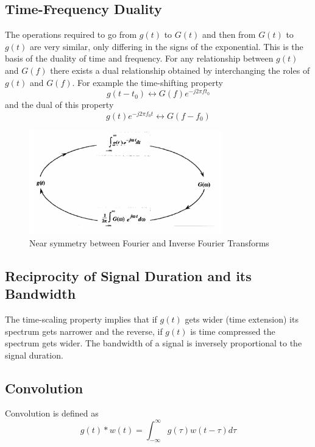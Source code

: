 \documentclass{article}
\begin{document}
    \subsection{Time-Frequency Duality}
    The operations required to go from $g(t)$ to $G(t)$ and then from $G(t)$ to $g(t)$ are very similar, only differing in the signs of the exponential.
    This is the basis of the duality of time and frequency. For any relationship between $g(t)$ and $G(f)$ there exists a dual relationship obtained 
    by interchanging the roles of $g(t)$ and $G(f)$. For example the time-shifting property 
    \begin{equation}
        g(t-t_0) \leftrightarrow G(f)e^{-j2\pi ft_0}
    \end{equation}
    and the dual of this property 
    \begin{equation}
        g(t)e^{-j2\pi f_0t} \leftrightarrow G(f-f_0)
    \end{equation}

    \begin{figure}[h]
        \centering
        \includegraphics[width=0.75\textwidth]{td}
        \caption{Near symmetry between Fourier and Inverse Fourier Transforms}
    \end{figure}

    \subsection{Reciprocity of Signal Duration and its Bandwidth}
    The time-scaling property implies that if $g(t)$ gets wider (time extension) its spectrum gets narrower and the reverse, if $g(t)$ is time compressed 
    the spectrum gets wider. The bandwidth of a signal is inversely proportional to the signal duration.

    \subsection{Convolution}
    Convolution is defined as 
    \begin{equation}
        g(t) \ast w(t) = \int_{-\infty}^{\infty}g(\tau)w(t-\tau)d\tau
    \end{equation}
\end{document}
